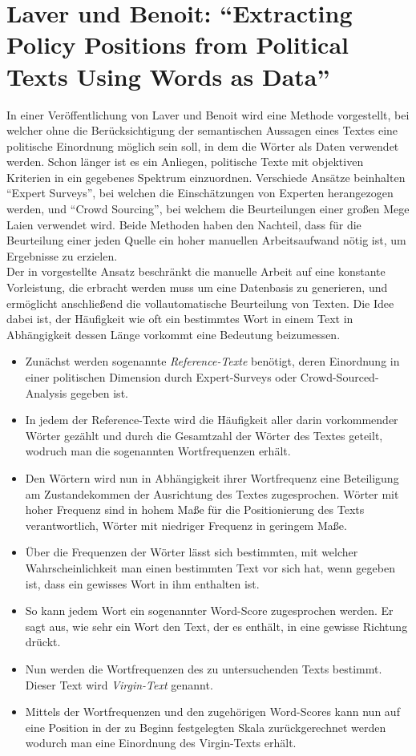 
\section{Laver und Benoit: \enquote{Extracting Policy Positions from Political Texts Using Words as Data}  }
In einer Veröffentlichung von Laver und Benoit \cite{LuB} wird eine Methode vorgestellt, bei welcher ohne die Berücksichtigung der semantischen Aussagen eines Textes eine politische Einordnung möglich sein soll, in dem die Wörter als Daten verwendet werden. 
Schon länger ist es ein Anliegen, politische Texte mit objektiven Kriterien in ein gegebenes Spektrum einzuordnen. Verschiede Ansätze beinhalten \enquote{Expert Surveys}, bei welchen die Einschätzungen von Experten herangezogen werden, und \enquote{Crowd Sourcing}, bei welchem die Beurteilungen einer großen Mege Laien verwendet wird. Beide Methoden haben den Nachteil, dass für die Beurteilung einer jeden Quelle ein hoher manuellen Arbeitsaufwand nötig ist, um Ergebnisse zu erzielen. \\
Der in  \cite{LuB} vorgestellte Ansatz beschränkt die manuelle Arbeit auf eine konstante Vorleistung, die erbracht werden muss um eine Datenbasis zu generieren, und ermöglicht anschließend die vollautomatische Beurteilung von Texten. Die Idee dabei ist, der Häufigkeit wie oft ein bestimmtes Wort in einem Text in Abhängigkeit dessen Länge vorkommt eine Bedeutung beizumessen. 
\begin{itemize}
\item Zunächst werden sogenannte \emph{Reference-Texte} benötigt, deren Einordnung in einer politischen Dimension durch Expert-Surveys oder Crowd-Sourced-Analysis gegeben ist.
\item In jedem der Reference-Texte wird die Häufigkeit aller darin vorkommender Wörter gezählt und durch die Gesamtzahl der Wörter des Textes geteilt, wodruch man die sogenannten Wortfrequenzen erhält.
\item Den Wörtern wird nun in Abhängigkeit ihrer Wortfrequenz eine Beteiligung am Zustandekommen der Ausrichtung des Textes zugesprochen. Wörter mit hoher Frequenz sind in hohem Maße für die Positionierung des Texts verantwortlich, Wörter mit niedriger Frequenz in geringem Maße.
\item Über die Frequenzen der Wörter lässt sich bestimmten, mit welcher Wahrscheinlichkeit man einen bestimmten Text vor sich hat, wenn gegeben ist, dass ein gewisses Wort in ihm enthalten ist.
\item So kann jedem Wort ein sogenannter Word-Score zugesprochen werden. Er sagt aus, wie sehr ein Wort den Text, der es enthält, in eine gewisse Richtung drückt.
\item Nun werden die Wortfrequenzen des zu untersuchenden Texts bestimmt. Dieser Text wird \emph{Virgin-Text} genannt.
\item Mittels der Wortfrequenzen und den zugehörigen Word-Scores kann nun auf eine Position in der zu Beginn festgelegten Skala zurückgerechnet werden wodurch man eine Einordnung des Virgin-Texts erhält.  
\end{itemize}

